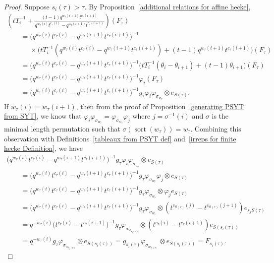 \documentclass[10pt,a4paper]{amsart}
\numberwithin{equation}{section}
\theoremstyle{definition}
\DeclareMathOperator{\sort}{sort}
\begin{document}
\begin{proof}
 Suppose $s_i(\tau) > \tau$. By Proposition~\ref{additional relations for affine hecke},
 \begin{gather*}
 \left( tT_{i}^{-1} + \frac{(t-1)q^{w_{\tau}(i+1)}t^{c_{\tau}(i+1)}}{q^{w_{\tau}(i)}t^{c_{\tau}(i)}-q^{w_{\tau}(i+1)}t^{c_{\tau}(i+1)}}\right)(F_{\tau}) \\
 \qquad = \bigl( q^{w_{\tau}(i)}t^{c_{\tau}(i)}-q^{w_{\tau}(i+1)}t^{c_{\tau}(i+1)}\bigr)^{-1} \\
 \phantom{\qquad = }{} \times\bigl( tT_{i}^{-1}(q^{w_{\tau}(i)}t^{c_{\tau}(i)}-q^{w_{\tau}(i+1)}t^{c_{\tau}(i+1)}) + (t-1)q^{w_{\tau}(i+1)}t^{c_{\tau}(i+1)}\bigr)(F_{\tau}) \\
 \qquad = \bigl( q^{w_{\tau}(i)}t^{c_{\tau}(i)}-q^{w_{\tau}(i+1)}t^{c_{\tau}(i+1)}\bigr)^{-1} \bigl( tT_{i}^{-1}(\theta_{i}-\theta_{i+1}) + (t-1)\theta_{i+1}\bigr)(F_{\tau})\\
 \qquad = \bigl( q^{w_{\tau}(i)}t^{c_{\tau}(i)}-q^{w_{\tau}(i+1)}t^{c_{\tau}(i+1)}\bigr)^{-1} \varphi_i(F_{\tau}) \\
 \qquad = \bigl( q^{w_{\tau}(i)}t^{c_{\tau}(i)}-q^{w_{\tau}(i+1)}t^{c_{\tau}(i+1)}\bigr)^{-1}g_{\tau} \varphi_{i}\varphi_{\sigma_{w_{\tau}}} \otimes e_{S(\tau)}.
 \end{gather*}
 If $w_{\tau}(i) = w_{\tau}(i+1)$, then from the proof of Proposition~\ref{generating PSYT from SYT}, we know that $\varphi_i \varphi_{\sigma_{w_{\tau}}} = \varphi_{\sigma_{w_{\tau}}} \varphi_j$ where $j= \sigma^{-1}(i)$ and $\sigma$ is the minimal length permutation such that $\sigma( \sort(w_{\tau})) = w_{\tau}$. Combining this observation with Definitions~\ref{tableaux from PSYT def} and~\ref{irreps for finite hecke Definition}, we have
 \begin{gather*}
 \bigl( q^{w_{\tau}(i)}t^{c_{\tau}(i)}-q^{w_{\tau}(i+1)}t^{c_{\tau}(i+1)}\bigr)^{-1}g_{\tau} \varphi_{i}\varphi_{\sigma_{w_{\tau}}} \otimes e_{S(\tau)} \\
 \qquad =\bigl( q^{w_{\tau}(i)}t^{c_{\tau}(i)}-q^{w_{\tau}(i+1)}t^{c_{\tau}(i+1)}\bigr)^{-1}g_{\tau} \varphi_{\sigma_{w_{\tau}}}\varphi_{j} \otimes e_{S(\tau)} \\
 \qquad = \bigl( q^{w_{\tau}(i)}t^{c_{\tau}(i)}-q^{w_{\tau}(i+1)}t^{c_{\tau}(i+1)}\bigr)^{-1}g_{\tau} \varphi_{\sigma_{w_{\tau}}} \otimes \varphi_{j}e_{S(\tau)} \\
 \qquad = \bigl( q^{w_{\tau}(i)}t^{c_{\tau}(i)}-q^{w_{\tau}(i+1)}t^{c_{\tau}(i+1)}\bigr)^{-1}g_{\tau} \varphi_{\sigma_{w_{\tau}}} \otimes (t^{c_{S(\tau)}(j)}-t^{c_{S(\tau)}(j+1)}) e_{s_jS(\tau)} \\
 \qquad = q^{-w_{\tau}(i)}\bigl( t^{c_{\tau}(i)}-t^{c_{\tau}(i+1)}\bigr)^{-1}g_{\tau} \varphi_{\sigma_{w_{s_i(\tau)}}} \otimes (t^{c_{\tau}(i)}-t^{c_{\tau}(i+1)}) e_{S(s_i(\tau))} \\
 \qquad = q^{-w_{\tau}(i)}g_{\tau}\varphi_{\sigma_{w_{s_i(\tau)}}} \otimes e_{S(s_i(\tau))} = g_{s_i(\tau)}\varphi_{\sigma_{w_{s_i(\tau)}}} \otimes e_{S(s_i(\tau))} = F_{s_i(\tau)}.
 \end{gather*}


\end{proof}
\end{document}
